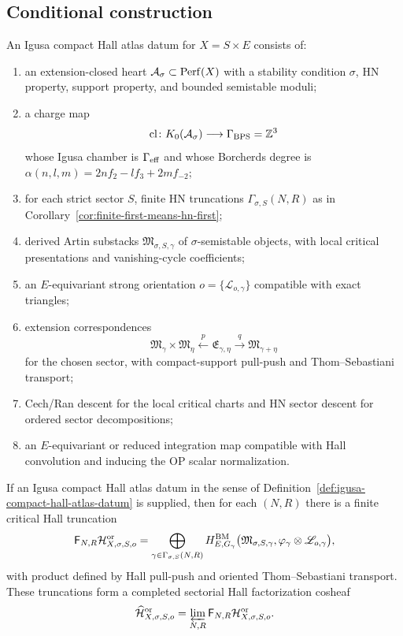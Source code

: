 \subsection{Conditional construction}

\begin{definition}
\label{def:igusa-compact-hall-atlas-datum}
An Igusa compact Hall atlas datum for \(X=S\times E\) consists of:
\begin{enumerate}
\item an extension-closed heart \(\mathcal A_\sigma\subset\operatorname{Perf}(X)\)
  with a stability condition \(\sigma\), HN property, support property,
  and bounded semistable moduli;
\item a charge map
  \[
    \operatorname{cl}\colon K_0(\mathcal A_\sigma)\longrightarrow
    \Gamma_{\mathrm{BPS}}=\mathbb Z^3
  \]
  whose Igusa chamber is \(\Gamma_{\mathrm{eff}}\) and whose Borcherds degree is
  \(\alpha(n,l,m)=2nf_2-lf_3+2mf_{-2}\);
\item for each strict sector \(S\), finite HN truncations
  \(\Gamma_{\sigma,S}(N,R)\) as in
  Corollary~\ref{cor:finite-first-means-hn-first};
\item derived Artin substacks
  \(\mathfrak M_{\sigma,S,\gamma}\) of \(\sigma\)-semistable objects,
  with local critical presentations and vanishing-cycle coefficients;
\item an \(E\)-equivariant strong orientation
  \(o=\{\mathscr L_{o,\gamma}\}\) compatible with exact triangles;
\item extension correspondences
  \[
    \mathfrak M_{\gamma}\times\mathfrak M_{\eta}
    \xleftarrow{\ p\ }
    \mathfrak E_{\gamma,\eta}
    \xrightarrow{\ q\ }
    \mathfrak M_{\gamma+\eta}
  \]
  for the chosen sector, with compact-support pull-push and
  Thom--Sebastiani transport;
\item Cech/Ran descent for the local critical charts and HN sector
  descent for ordered sector decompositions;
\item an \(E\)-equivariant or reduced integration map compatible with
  Hall convolution and inducing the OP scalar normalization.
\end{enumerate}
\end{definition}

\begin{theorem}
\label{thm:conditional-compact-hall-atlas}
If an Igusa compact Hall atlas datum in the sense of
Definition~\ref{def:igusa-compact-hall-atlas-datum} is supplied, then
for each \((N,R)\) there is a finite critical Hall truncation
\[
  \mathsf F_{N,R}\mathcal H^{\mathrm{or}}_{X,\sigma,S,o}
  =
  \bigoplus_{\gamma\in\Gamma_{\sigma,S}(N,R)}
  H^{\operatorname{BM}}_{E,G_\gamma}
  \bigl(\mathfrak M_{\sigma,S,\gamma},
  \varphi_{\gamma}\otimes\mathscr L_{o,\gamma}\bigr),
\]
with product defined by Hall pull-push and oriented
Thom--Sebastiani transport.  These truncations form a completed
sectorial Hall factorization cosheaf
\[
  \widehat{\mathcal H}^{\mathrm{or}}_{X,\sigma,S,o}
  =
  \varprojlim_{N,R}
  \mathsf F_{N,R}\mathcal H^{\mathrm{or}}_{X,\sigma,S,o}.
\]
\end{theorem}

